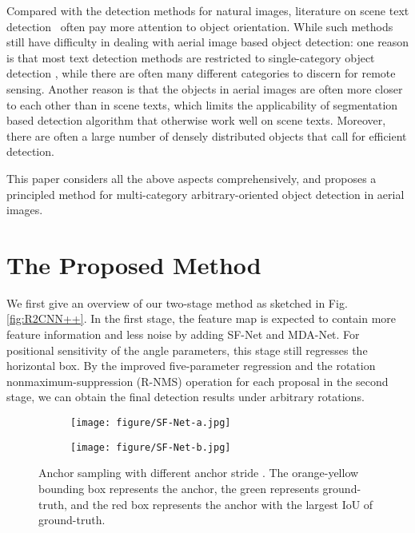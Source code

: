 \documentclass[10pt,twocolumn,letterpaper]{article}
\begin{document}
	


	Compared with the detection methods for natural images, literature on scene text detection~\cite{jiang2017r2cnn,ma2018arbitrary} often pay more attention to object orientation. While such methods still have difficulty in dealing with aerial image based object detection: one reason is that most text detection methods are restricted to single-category object detection \cite{zhou2017east, Shi2017Detecting,deng2018pixellink}, while there are often many different categories to discern for remote sensing. Another reason is that the objects in aerial images are often more closer to each other than in scene texts, which limits the applicability of segmentation based detection algorithm \cite{deng2018pixellink,zhou2017east} that otherwise work well on scene texts. Moreover, there are often a large number of densely distributed objects that call for efficient detection.
	
	
	
	This paper considers all the above aspects comprehensively, and proposes a principled method for multi-category arbitrary-oriented object detection in aerial images.
	
\section{The Proposed Method}


We first give an overview of our two-stage method as sketched in Fig. \ref{fig:R2CNN++}. In the first stage, the feature map is expected to contain more feature information and less noise by adding SF-Net and MDA-Net. For positional sensitivity of the angle parameters, this stage still regresses the horizontal box. By the improved five-parameter regression and the rotation nonmaximum-suppression (R-NMS) operation for each proposal in the second stage, we can obtain the final detection results under arbitrary rotations.
	\begin{figure}[!tb]
		\centering
		\begin{subfigure}{.24\textwidth}
			\centering
			\texttt{[image: figure/SF-Net-a.jpg]}
			\caption{}
			\label{fig:SF-Net-a}
		\end{subfigure}\begin{subfigure}{.24\textwidth}
			\centering
			\texttt{[image: figure/SF-Net-b.jpg]}
			\caption{}
			\label{fig:SF-Net-b}
		\end{subfigure}
		\vspace{-10pt}
		\caption{Anchor sampling with different anchor stride . The orange-yellow bounding box represents the anchor, the green represents ground-truth, and the red box represents the anchor with the largest IoU of ground-truth.}
		\label{fig:SA}
	\end{figure}
\end{document}
